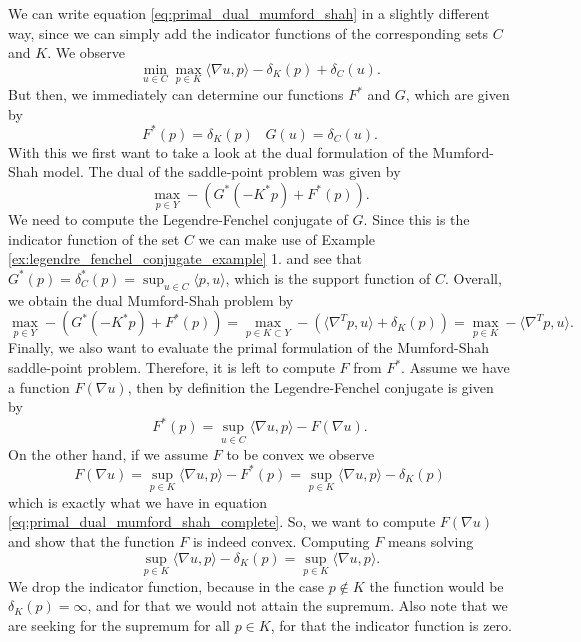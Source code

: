 		We can write equation \ref{eq:primal_dual_mumford_shah} in a slightly different way, since we can simply add the indicator functions of the corresponding sets $C$ and $K$. We observe
			\begin{equation}
				\min_{u \in C} \max_{p \in K} \langle \nabla u, p \rangle - \delta_{K}(p) + \delta_{C}(u).
				\label{eq:primal_dual_mumford_shah_complete}
			\end{equation}
		But then, we immediately can determine our functions $F^{\ast}$ and $G$, which are given by
			$$
				F^{\ast}(p) = \delta_{K}(p) \,\,\,\,\, G(u) = \delta_{C}(u).
			$$
		With this we first want to take a look at the dual formulation of the Mumford-Shah model. The dual of the saddle-point problem was given by
			$$
	            \max_{p \in Y} -(G^{\ast}(-K^{\ast}p) + F^{\ast}(p)).
	        $$
	    We need to compute the Legendre-Fenchel conjugate of $G$. Since this is the indicator function of the set $C$ we can make use of Example \ref{ex:legendre_fenchel_conjugate_example} 1. and see that $G^{\ast}(p) = \delta^{\ast}_{C}(p) = \sup_{u \in C} \langle p, u \rangle$, which is the support function of $C$. Overall, we obtain the dual Mumford-Shah problem by
	    	\begin{equation}
	    		\max_{p \in Y} -(G^{\ast}(-K^{\ast}p) + F^{\ast}(p)) = \max_{p \in K \subset Y} -(\langle \nabla^{T}p, u \rangle + \delta_{K}(p)) = \max_{p \in K} -\langle \nabla^{T}p, u \rangle.
	    	\label{eq:dual_mumford_shah}
	    	\end{equation}
	    Finally, we also want to evaluate the primal formulation of the Mumford-Shah saddle-point problem. Therefore, it is left to compute $F$ from $F^{\ast}$. Assume we have a function $F(\nabla u)$, then by definition the Legendre-Fenchel conjugate is given by
	    	$$
	    		F^{\ast}(p) = \sup_{u \in C} \langle \nabla u, p \rangle - F(\nabla u).
	    	$$
	    On the other hand, if we assume $F$ to be convex we observe
	    	$$
	    		F(\nabla u) = \sup_{p \in K} \langle \nabla u, p \rangle - F^{\ast}(p) = \sup_{p \in K} \langle \nabla u, p \rangle - \delta_{K}(p)
	    	$$
	    which is exactly what we have in equation \ref{eq:primal_dual_mumford_shah_complete}. So, we want to compute $F(\nabla u)$ and show that the function $F$ is indeed convex. Computing $F$ means solving
	    	$$
	    		\sup_{p \in K} \langle \nabla u, p \rangle - \delta_{K}(p) = \sup_{p \in K} \langle \nabla u, p \rangle.
	    	$$
	    We drop the indicator function, because in the case $p \notin K$ the function would be $\delta_{K}(p) = \infty$, and for that we would not attain the supremum. Also note that we are seeking for the supremum for all $p \in K$, for that the indicator function is zero.
